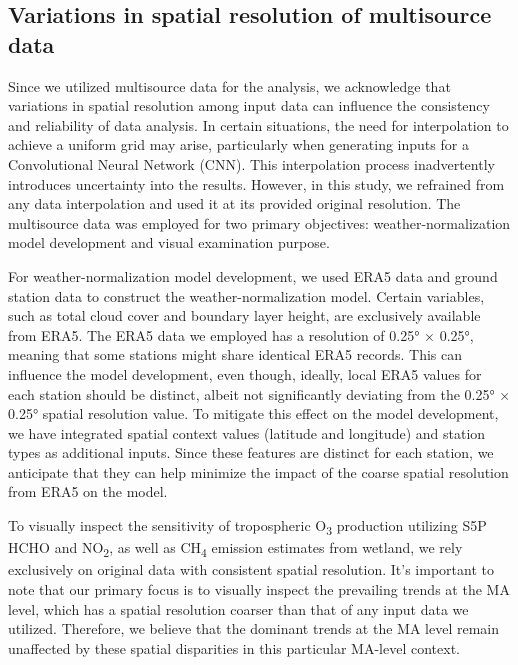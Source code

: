 \subsection{Variations in spatial resolution of multisource data}
Since we utilized multisource data for the analysis, we acknowledge that variations in spatial resolution among input data can influence the consistency and reliability of data analysis. In certain situations, the need for interpolation to achieve a uniform grid may arise, particularly when generating inputs for a Convolutional Neural Network (CNN). This interpolation process inadvertently introduces uncertainty into the results.  However, in this study, we refrained from any data interpolation and used it at its provided original resolution. The multisource data was employed for two primary objectives: weather-normalization model development and visual examination purpose. \par
For weather-normalization model development, we used ERA5 data and ground station data to construct the weather-normalization model. Certain variables, such as total cloud cover and boundary layer height, are exclusively available from ERA5. The ERA5 data we employed has a resolution of 0.25° × 0.25°, meaning that some stations might share identical ERA5 records. This can influence the model development, even though, ideally, local ERA5 values for each station should be distinct, albeit not significantly deviating from the 0.25° × 0.25° spatial resolution value. To mitigate this effect on the model development, we have integrated spatial context values (latitude and longitude) and station types as additional inputs. Since these features are distinct for each station, we anticipate that they can help minimize the impact of the coarse spatial resolution from ERA5 on the model. \par
To visually inspect the sensitivity of tropospheric O\textsubscript{3} production utilizing S5P HCHO and NO\textsubscript{2}, as well as CH\textsubscript{4} emission estimates from wetland, we rely exclusively on original data with consistent spatial resolution. It's important to note that our primary focus is to visually inspect the prevailing trends at the MA level, which has a spatial resolution coarser than that of any input data we utilized. Therefore, we believe that the dominant trends at the MA level remain unaffected by these spatial disparities in this particular MA-level context. \par

